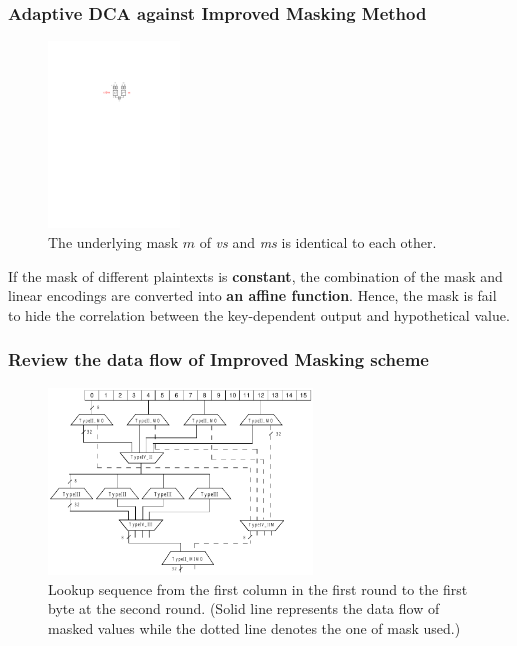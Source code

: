 \documentclass{beamer}
\begin{document}
\frame
{
	\frametitle{Adaptive DCA against Improved Masking Method}
	\begin{figure}
		\centering
		\includegraphics[width=3.5cm]{./pics/IIMIMO1.pdf}
		\caption{The underlying mask $m$ of \textit{vs} and \textit{ms} is identical to each other.}
	\end{figure}
	
	If the mask of different plaintexts is \textbf{constant}, the combination of the mask and linear encodings are converted into \textbf{an affine function}. Hence, the mask is fail to hide the correlation between the key-dependent output and  hypothetical value.
}


\frame
{
	\frametitle{Review the data flow of Improved Masking scheme}
	\begin{figure}
		\centering
		\includegraphics[width=7cm]{./pics/DCA_R12.pdf}
		\caption{Lookup sequence from the first column in the first round to the first byte at the second round. (Solid line represents the data flow of masked values while the dotted line denotes the one of mask used.)}
	\end{figure}
}
\end{document}

